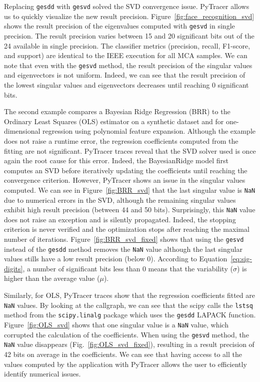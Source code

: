 \documentclass[10pt,journal,compsoc]{IEEEtran}
\newcommand{\pytracer}[0]{PyTracer\xspace}
\DeclareRobustCommand{\add}[1]{\textcolor{ao(english)}{#1}}%
\DeclareRobustCommand{\add}[1]{#1}
\begin{document}
Replacing \texttt{gesdd} \add{with} \texttt{gesvd} solved the SVD convergence issue.
\pytracer allows \add{us} to quickly visualize the new result precision.
Figure~\ref{fig:face_recognition_svd} shows the result precision of the eigenvalues
computed with \texttt{gesvd} in single precision. The result precision
varies between 15 and 20
significant bits out of the 24 available in single precision. The classifier
metrics (precision, recall, F1-score, and support) are identical to the IEEE
execution for all MCA samples. We can note that even with the \texttt{gesvd} method,
the result precision of the singular values and eigenvectors is not uniform. 
Indeed, we can see that the result precision of the lowest singular values and eigenvectors decreases 
until reaching 0 significant bits.

The second example compares a Bayesian Ridge Regression (BRR) to the Ordinary
Least Squares (OLS) estimator on a synthetic dataset and for one-dimensional
regression using polynomial feature expansion. Although the example does not
raise a runtime error, the regression coefficients computed from the fitting are
not significant. \pytracer traces reveal that the SVD solver used is once again the root
cause for this error. Indeed, the BayesianRidge model first computes an SVD
before iteratively updating the coefficients until reaching the convergence
criterion. However, PyTracer shows an issue in the singular values computed.
We can see in Figure~\ref{fig:BRR_svd} that the last singular value is
\texttt{NaN} due to numerical errors in the SVD, although the remaining
singular values exhibit high result precision (between 44 and 50 bits).
Surprisingly, this \texttt{NaN} value does not raise an exception and is silently
propagated. Indeed, the stopping criterion is never verified and the 
optimization stops after reaching the maximal number of iterations.
Figure~\ref{fig:BRR_svd_fixed} shows that using
the \texttt{gesvd} instead of the \texttt{gesdd} method removes the \texttt{NaN} value
although the last singular values stills have a low result precision (below 0).
According to Equation~\ref{eq:sig-digits}, a number of significant bits less than 0 means that the
variability ($\sigma$) is higher than the average value ($\mu$).


Similarly, for OLS, PyTracer traces show that the
regression coefficients fitted are \texttt{NaN} values. By looking at the callgraph, we can
see that the scipy calls the \texttt{lstsq} method from the
\texttt{scipy.linalg} package which uses the \texttt{gesdd} LAPACK function.
Figure~\ref{fig:OLS_svd} shows that one singular value is a \texttt{NaN} value,
which corrupted the calculation of the coefficients. When using the \texttt{gesvd} method, 
the \texttt{NaN} value disappears 
(Fig.~\ref{fig:OLS_svd_fixed}), resulting in a result precision of
42 bits on average in the coefficients. We can see that having
access to all the values computed by the application with PyTracer allows
the user to efficiently identify numerical issues.
\end{document}
